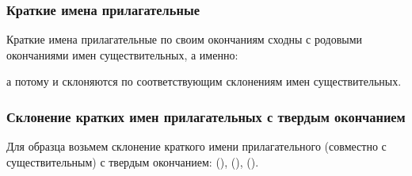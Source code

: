 \documentclass[11pt,a4paper,oneside]{memoir}
\begin{document}
                \subsubsection{Краткие имена прилагательные}

    Краткие имена прилагательные по своим окончаниям сходны с родовыми окончаниями имен существительных, а именно:
    
    \medskip{}

    а потому и склоняются по соответствующим склонениям имен существительных.

                \subsubsection{Склонение кратких имен прилагательных с твердым окончанием}

    Для образца возьмем склонение краткого имени прилагательного (совместно с существительным) с твердым окончанием: {} ({}), {} ({}), {} ({}).
    
\end{document}
